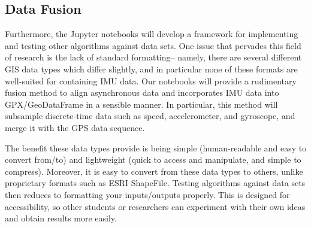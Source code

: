 \documentclass{article}
\numberwithin{equation}{section}
\theoremstyle{definition}
\begin{document}



\subsection{Data Fusion}
Furthermore, the Jupyter notebooks will develop a framework for implementing and testing other algorithms against data sets. One issue that pervades this field of research is the lack of standard formatting-- namely, there are several different GIS data types which differ slightly, and in particular none of these formats are well-suited for containing IMU data. Our notebooks will provide a rudimentary fusion method to align asynchronous data and incorporates IMU data into GPX/GeoDataFrame in a sensible manner. In particular, this method will subsample discrete-time data such as speed, accelerometer, and gyroscope, and merge it with the GPS data sequence.

The benefit these data types provide is being simple (human-readable and easy to convert from/to) and lightweight (quick to access and manipulate, and simple to compress). Moreover, it is easy to convert from these data types to others, unlike proprietary formats such as ESRI ShapeFile. Testing algorithms against data sets then reduces to formatting your inputs/outputs properly. This is designed for accessibility, so other students or researchers can experiment with their own ideas and obtain results more easily. %
\end{document}

